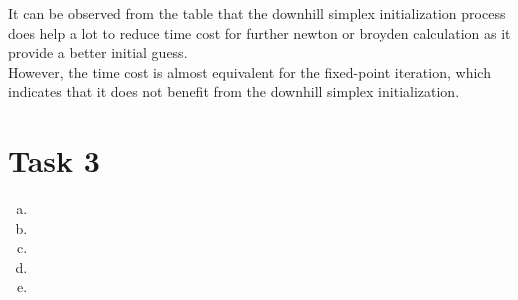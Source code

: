 \documentclass[paper=a4, fontsize=11pt]{scrartcl} %
\numberwithin{equation}{section} %
\numberwithin{figure}{section} %
\numberwithin{table}{section} %
\begin{document}
	It can be observed from the table that the downhill simplex initialization process does help a lot to reduce time cost for further newton or broyden calculation as it provide a better initial guess. \\
	However, the time cost is almost equivalent for the fixed-point iteration, which indicates that it does not benefit from the downhill simplex initialization. 

\section{Task 3}
	\begin{enumerate}[(a)]
		\item 

		\item 

		\item 

		\item 

		\item 
			
	\end{enumerate}
\end{document}
